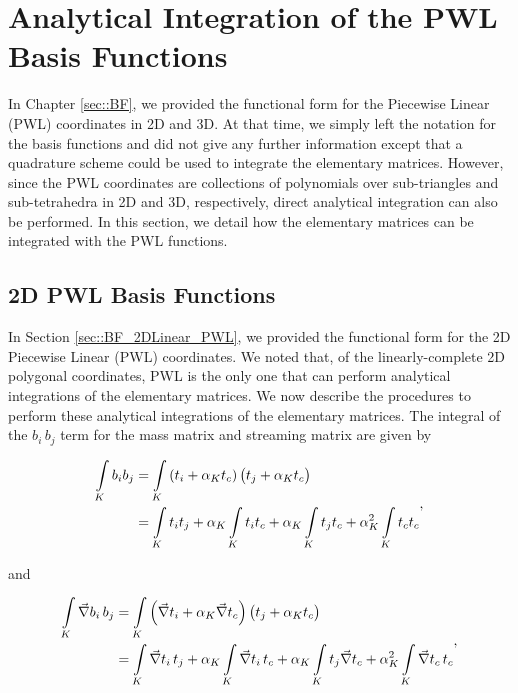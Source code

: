 \section{Analytical Integration of the PWL Basis Functions}
\label{sec::appendix_BF_PWLInt}

In Chapter \ref{sec::BF}, we provided the functional form for the Piecewise Linear (PWL) coordinates in 2D and 3D. At that time, we simply left the notation for the basis functions and did not give any further information except that a quadrature scheme could be used to integrate the elementary matrices. However, since the PWL coordinates are collections of polynomials over sub-triangles and sub-tetrahedra in 2D and 3D, respectively, direct analytical integration can also be performed. In this section, we detail how the elementary matrices can be integrated with the PWL functions.

\subsection{2D PWL Basis Functions}
\label{sec::appendix_BF_PWLInt_2D}

In Section \ref{sec::BF_2DLinear_PWL}, we provided the functional form for the 2D Piecewise Linear (PWL) coordinates. We noted that, of the linearly-complete 2D polygonal coordinates, PWL is the only one that can perform analytical integrations of the elementary matrices. We now describe the procedures to perform these analytical integrations of the elementary matrices. The integral of the $b_i \, b_j$ term for the mass matrix and streaming matrix are given by 

\begin{equation}
\label{eq::App_BF_2D_triref_massterm}
\begin{aligned}
\int\displaylimits_K b_i b_j &= \int\displaylimits_K \left( t_i + \alpha_K t_c  \right) \left(  t_j + \alpha_K t_c \right) \\
&= \int\displaylimits_K t_i t_j + \alpha_K \int\displaylimits_K t_i t_c + \alpha_K \int\displaylimits_K t_j t_c + \alpha_K^2 \int\displaylimits_K t_c t_c
\end{aligned},
\end{equation}

\noindent and

\begin{equation}
\label{eq::App_BF_2D_triref_gradterm}
\begin{aligned}
\int\displaylimits_K \vec{\nabla} b_i \,  b_j &= \int\displaylimits_K \left( \vec{\nabla} t_i + \alpha_K \vec{\nabla} t_c  \right) \left(  t_j + \alpha_K t_c \right) \\
&= \int\displaylimits_K \vec{\nabla} t_i \,t_j + \alpha_K \int\displaylimits_K \vec{\nabla} t_i\, t_c + \alpha_K \int\displaylimits_K t_j \vec{\nabla} t_c + \alpha_K^2 \int\displaylimits_K \vec{\nabla} t_c \, t_c
\end{aligned} ,
\end{equation}

